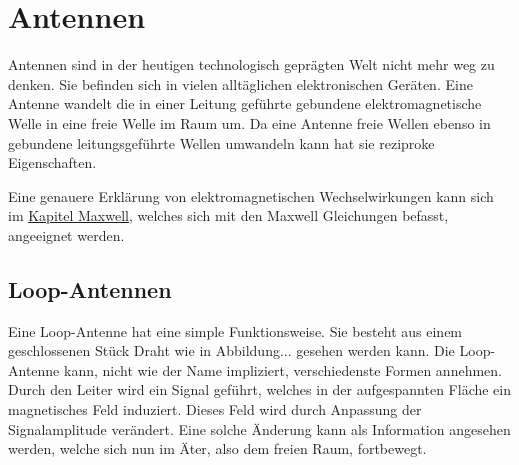 %
%
% 
%
%

\section{Antennen\label{antennen:antennenAllgemein}}

Antennen sind in der heutigen technologisch geprägten Welt nicht mehr weg zu denken. Sie befinden sich in vielen alltäglichen elektronischen Geräten. Eine Antenne wandelt die in einer Leitung geführte gebundene elektromagnetische Welle in eine freie Welle im Raum um. Da eine Antenne freie Wellen ebenso in gebundene leitungsgeführte Wellen umwandeln kann hat sie reziproke Eigenschaften.

Eine genauere Erklärung von elektromagnetischen Wechselwirkungen kann sich im \href{chapter:maxwell}{Kapitel Maxwell}, welches sich mit den Maxwell Gleichungen befasst, angeeignet werden. 
\subsection{Loop-Antennen\label{antennen:antennenAllgemein_loop}}
Eine Loop-Antenne hat eine simple Funktionsweise. Sie besteht aus einem geschlossenen Stück Draht wie in Abbildung... gesehen werden kann. Die Loop-Antenne kann, nicht wie der Name impliziert, verschiedenste Formen annehmen. Durch den Leiter wird ein Signal geführt, welches in der aufgespannten Fläche ein magnetisches Feld induziert. Dieses Feld wird durch Anpassung der Signalamplitude verändert. Eine solche Änderung kann als Information angesehen werden, welche sich nun im Äter, also dem freien Raum, fortbewegt.



